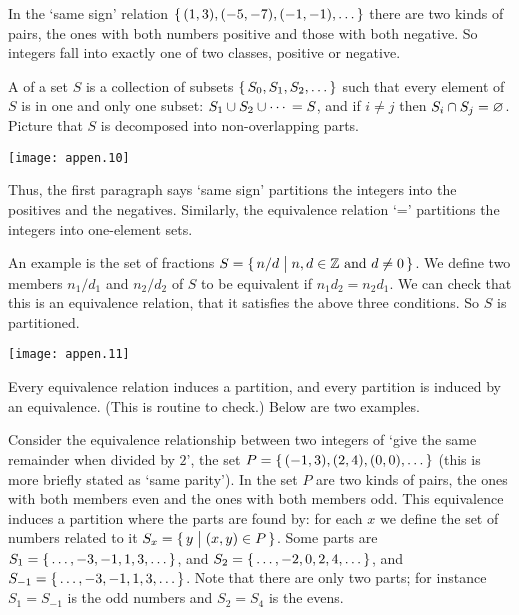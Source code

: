 In the `same sign' relation \( \mbox{$\{\, (1,3),(-5,-7),(-1,-1),\ldots\,\}$} \)
there are two kinds of pairs, the ones with both numbers positive
and those with both negative.
So integers fall into exactly one of two classes, positive or negative.

A  
of a set \( S \) is a collection of subsets
\( \mbox{$\{\,S_0,S_1,S_2,\ldots\,\}$} \) such that
every element of \( S \) is in one and only one subset:
\( S_1\cup S_2\cup \cdots{} = S \), and
if \( i\neq j \) then
\( S_i\cap S_j=\varnothing \).
Picture that \( S \) is decomposed into non-overlapping parts.
\begin{center}
  \texttt{[image: appen.10]}
\end{center}
Thus, the first paragraph says `same sign' partitions
the integers into the positives and the negatives.
Similarly, the equivalence relation `=' partitions the integers into
one-element sets.

An example is the set of fractions 
$S=\mbox{$\{\,n/d\bigm| \text{$n,d\in\mathbb{Z}$ and $d\neq 0$}\,\}$}$.
We define two members $n_1/d_1$ and $n_2/d_2$ of $S$ 
to be equivalent if $n_1d_2=n_2d_1$.
We can check that this is an equivalence relation, that
it satisfies the above three conditions.
So $S$ is partitioned.
\begin{center}
  \texttt{[image: appen.11]}
\end{center}

Every equivalence relation induces a partition, and every 
partition is induced by an equivalence.
(This is routine to check.)
Below are two examples.
 
Consider the equivalence relationship between two integers of 
`give the same remainder when divided by \( 2 \)',
the set \( P=\mbox{$\{\, (-1,3),(2,4),(0,0),\ldots\,\}$} \)
(this is more briefly stated as `same parity').
In the set $P$ are two kinds of pairs, the ones with both members even
and the ones with both members odd.
This equivalence induces a partition where the parts are found by: 
for each \( x \) we define the set of numbers related to
it \( S_x=\mbox{$\{\,y\bigm| (x,y)\in P\,\}$} \).
Some parts are
\( S_1=\mbox{$\{\,\ldots,-3,-1,1,3,\ldots\,\}$} \), and
\( S_2=\mbox{$\{\,\ldots,-2,0,2,4,\ldots\,\}$} \), and
\( S_{-1}=\mbox{$\{\,\ldots,-3,-1,1,3,\ldots\,\}$} \).
Note that there are only two parts; 
for instance \( S_1=S_{-1} \) is the odd numbers and
$S_2=S_4$ is the evens.

